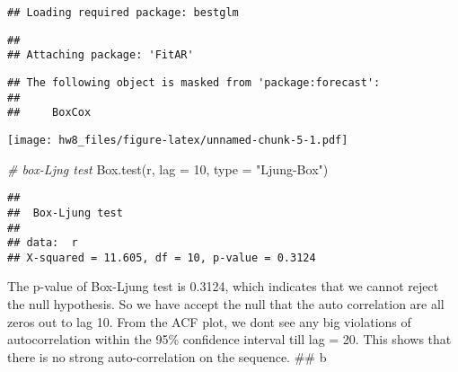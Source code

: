 \documentclass[
]{article}
\newenvironment{Shaded}{\begin{snugshade}}{\end{snugshade}}
\newcommand{\AttributeTok}[1]{\textcolor[rgb]{0.77,0.63,0.00}{#1}}
\newcommand{\CommentTok}[1]{\textcolor[rgb]{0.56,0.35,0.01}{\textit{#1}}}
\newcommand{\DecValTok}[1]{\textcolor[rgb]{0.00,0.00,0.81}{#1}}
\newcommand{\FunctionTok}[1]{\textcolor[rgb]{0.00,0.00,0.00}{#1}}
\newcommand{\NormalTok}[1]{#1}
\newcommand{\OtherTok}[1]{\textcolor[rgb]{0.56,0.35,0.01}{#1}}
\newcommand{\SpecialCharTok}[1]{\textcolor[rgb]{0.00,0.00,0.00}{#1}}
\newcommand{\StringTok}[1]{\textcolor[rgb]{0.31,0.60,0.02}{#1}}
\begin{document}
\begin{verbatim}
## Loading required package: bestglm
\end{verbatim}

\begin{verbatim}
## 
## Attaching package: 'FitAR'
\end{verbatim}

\begin{verbatim}
## The following object is masked from 'package:forecast':
## 
##     BoxCox
\end{verbatim}

\begin{Shaded}
\end{Shaded}

\texttt{[image: hw8\_files/figure-latex/unnamed-chunk-5-1.pdf]}

\begin{Shaded}
\begin{Highlighting}[]
\CommentTok{\# box{-}Ljng test}
\FunctionTok{Box.test}\NormalTok{(r, }\AttributeTok{lag =} \DecValTok{10}\NormalTok{, }\AttributeTok{type =} \StringTok{"Ljung{-}Box"}\NormalTok{)}
\end{Highlighting}
\end{Shaded}

\begin{verbatim}
## 
##  Box-Ljung test
## 
## data:  r
## X-squared = 11.605, df = 10, p-value = 0.3124
\end{verbatim}

The p-value of Box-Ljung test is 0.3124, which indicates that we cannot
reject the null hypothesis. So we have accept the null that the auto
correlation are all zeros out to lag 10. From the ACF plot, we dont see
any big violations of autocorrelation within the 95\% confidence
interval till lag = 20. This shows that there is no strong
auto-correlation on the sequence. \#\# b
\end{document}

